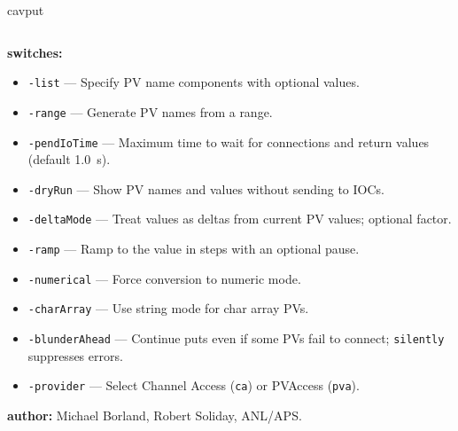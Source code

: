\begin{sddsprog}{cavput}
\begin{verbatim}
\end{verbatim}
\item \textbf{switches:}
\begin{itemize}
  \item {\tt -list} --- Specify PV name components with optional values.
  \item {\tt -range} --- Generate PV names from a range.
  \item {\tt -pendIoTime} --- Maximum time to wait for connections and return values (default 1.0~s).
  \item {\tt -dryRun} --- Show PV names and values without sending to IOCs.
  \item {\tt -deltaMode} --- Treat values as deltas from current PV values; optional factor.
  \item {\tt -ramp} --- Ramp to the value in steps with an optional pause.
  \item {\tt -numerical} --- Force conversion to numeric mode.
  \item {\tt -charArray} --- Use string mode for char array PVs.
  \item {\tt -blunderAhead} --- Continue puts even if some PVs fail to connect; \verb|silently| suppresses errors.
  \item {\tt -provider} --- Select Channel Access ({\tt ca}) or PVAccess ({\tt pva}).
\end{itemize}
\item \textbf{author:} Michael Borland, Robert Soliday, ANL/APS.
\end{sddsprog}
